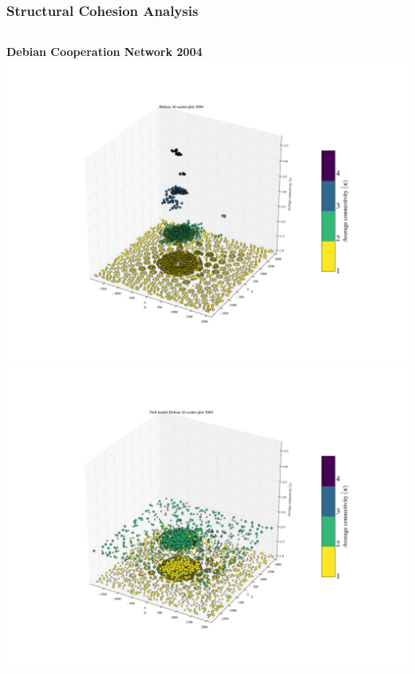 \documentclass[ignorenonframetext,red,8pt,notes=show]{beamer}
\begin{document}
\begin{frame}
\frametitle{Structural Cohesion Analysis}

\begin{columns}[c]
\begin{column}{0.5\textwidth}
\begin{center}
\textbf{Debian Cooperation Network 2004}
\includegraphics[scale=0.12]{../../figures/3d_scatter_debian_2004}
\newline
\includegraphics[scale=0.12]{../../figures/3d_scatter_debian_2004_null}
\end{center}
\end{column}


\end{columns}
\end{frame}
\end{document}
